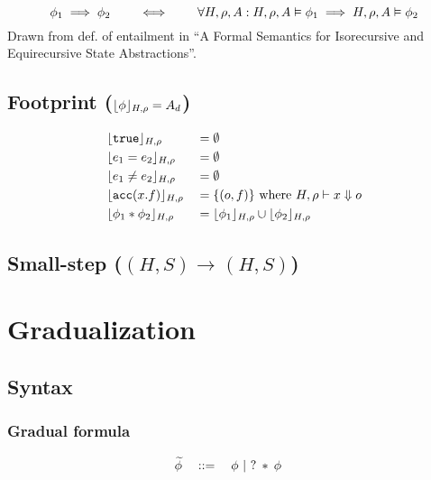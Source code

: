 \documentclass[11pt,a4paper]{article}
\begin{document}
\begin{equation*}
\phi_1 \implies \phi_2
\quad\quad \iff \quad\quad
\forall H, \rho, A: \evalphi \phi_1 \implies \evalphi \phi_2
\end{equation*}
Drawn from def. of entailment in ``A Formal Semantics for Isorecursive and Equirecursive State Abstractions''.

\subsection{Footprint ($\dynamicFP {H} {\rho} {\phi} = A_d$)}
\begin{align*}
 &\dynamicFP {H} {\rho} {\true}    		&&= \emptyset
\\ &\dynamicFP {H} {\rho} {e_1 = e_2}     	&&= \emptyset
\\ &\dynamicFP {H} {\rho} {e_1 \neq e_2}  	&&= \emptyset
\\ &\dynamicFP {H} {\rho} {\acc(x.f)} 		&&= \{(o,f)\} \text{ where } \evale x o
\\ &\dynamicFP {H} {\rho} {\phi_1 * \phi_2} &&= \dynamicFP {H} {\rho} {\phi_1} \cup \dynamicFP {H} {\rho} {\phi_2}
\end{align*}

\newcommand{\dType}[4]{#1, #2 \vdash #3 : #4}

\newcommand{\sstepGeneric}[5]{({#1}, {#2}) \rightarrow^{#3} ({#4}, {#5})}
\newcommand{\sstep}[4]{\sstepGeneric {#1} {#2} {} {#3} {#4}}
\newcommand{\sstepM}[4]{\sstepGeneric {#1} {#2} * {#3} {#4}} 
\newcommand{\sstepWS}[4]{\sstepGeneric {#1} {{#2} \cdot S} {} {#3} {{#4} \cdot S}}
\newcommand{\sstepWSX}[8]{\sstepGeneric {#1} {({#2},{#3},{#4}) \cdot S} {} {#5} {({#6},{#7},{#8}) \cdot S}}

\newcommand{\Tfs}{\overline{T}~\overline{f}}
\subsection{Small-step ($\sstep H S H S$)}

%

\section{Gradualization}
\subsection{Syntax}
\subsubsection{Gradual formula}
\begin{align*}
&\grad{\phi} \quad ::= \quad \phi ~|~ \withqm{\phi}
\end{align*}
\end{document}
